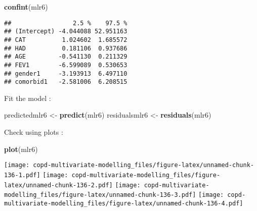 \documentclass[
]{article}
\newenvironment{Shaded}{\begin{snugshade}}{\end{snugshade}}
\newcommand{\FunctionTok}[1]{\textcolor[rgb]{0.13,0.29,0.53}{\textbf{#1}}}
\newcommand{\NormalTok}[1]{#1}
\newcommand{\OtherTok}[1]{\textcolor[rgb]{0.56,0.35,0.01}{#1}}
\begin{document}
\begin{Shaded}
\begin{Highlighting}[]
\FunctionTok{confint}\NormalTok{(mlr6)}
\end{Highlighting}
\end{Shaded}

\begin{verbatim}
##                 2.5 %    97.5 %
## (Intercept) -4.044088 52.951163
## CAT          1.024602  1.685572
## HAD          0.181106  0.937686
## AGE         -0.541130  0.211329
## FEV1        -6.599089  0.530653
## gender1     -3.193913  6.497110
## comorbid1   -2.581006  6.208515
\end{verbatim}

Fit the model :

\begin{Shaded}
\begin{Highlighting}[]
\NormalTok{predictedmlr6 }\OtherTok{\textless{}{-}} \FunctionTok{predict}\NormalTok{(mlr6)}
\NormalTok{residualsmlr6 }\OtherTok{\textless{}{-}} \FunctionTok{residuals}\NormalTok{(mlr6)}
\end{Highlighting}
\end{Shaded}

Check using plots :

\begin{Shaded}
\begin{Highlighting}[]
\FunctionTok{plot}\NormalTok{(mlr6)}
\end{Highlighting}
\end{Shaded}

\texttt{[image: copd-multivariate-modelling\_files/figure-latex/unnamed-chunk-136-1.pdf]}
\texttt{[image: copd-multivariate-modelling\_files/figure-latex/unnamed-chunk-136-2.pdf]}
\texttt{[image: copd-multivariate-modelling\_files/figure-latex/unnamed-chunk-136-3.pdf]}
\texttt{[image: copd-multivariate-modelling\_files/figure-latex/unnamed-chunk-136-4.pdf]}
\end{document}
